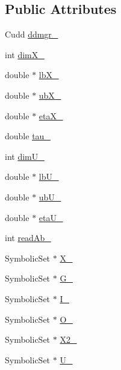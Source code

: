 \subsection*{Public Attributes}
\begin{DoxyCompactItemize}
\item 
Cudd \hyperlink{classscots_1_1Compare_a330d650aa232026ba22f43aa81974af9}{ddmgr\+\_\+}
\item 
int \hyperlink{classscots_1_1Compare_a5ca0b67f243d75684e573bdf39750298}{dim\+X\+\_\+}
\item 
double $\ast$ \hyperlink{classscots_1_1Compare_a73eb8628cb603f8e3fd914e01368c457}{lb\+X\+\_\+}
\item 
double $\ast$ \hyperlink{classscots_1_1Compare_a1ce31ce906f325470edb135b65a3a01a}{ub\+X\+\_\+}
\item 
double $\ast$ \hyperlink{classscots_1_1Compare_ae5fae0a0ea064b629885b69cc32014d1}{eta\+X\+\_\+}
\item 
double \hyperlink{classscots_1_1Compare_a1746834841252ede3651c0f5bfc3e27f}{tau\+\_\+}
\item 
int \hyperlink{classscots_1_1Compare_a4bcfca4afdbb0cc4d0d656702e9f2498}{dim\+U\+\_\+}
\item 
double $\ast$ \hyperlink{classscots_1_1Compare_a2e5b605b24f26910ea99264de9474a33}{lb\+U\+\_\+}
\item 
double $\ast$ \hyperlink{classscots_1_1Compare_a0b0e2f9dd8e872f49eb2a190d9e09dff}{ub\+U\+\_\+}
\item 
double $\ast$ \hyperlink{classscots_1_1Compare_a5bc5261e5403a3e984020cd8b05b587a}{eta\+U\+\_\+}
\item 
int \hyperlink{classscots_1_1Compare_ad18456a4cc253ae0d300cda74517e64b}{read\+Ab\+\_\+}
\item 
Symbolic\+Set $\ast$ \hyperlink{classscots_1_1Compare_a4d0bb95aefd7ffeda946bd79a8170825}{X\+\_\+}
\item 
Symbolic\+Set $\ast$ \hyperlink{classscots_1_1Compare_a1a7d912c19ff01269353ec705a257ad6}{G\+\_\+}
\item 
Symbolic\+Set $\ast$ \hyperlink{classscots_1_1Compare_a32b383c4e137a371859fdee22c165486}{I\+\_\+}
\item 
Symbolic\+Set $\ast$ \hyperlink{classscots_1_1Compare_a5dd50527db402893630c209d05be4ef0}{O\+\_\+}
\item 
Symbolic\+Set $\ast$ \hyperlink{classscots_1_1Compare_a3f1ba24992e2dfe24358087aeecb5a75}{X2\+\_\+}
\item 
Symbolic\+Set $\ast$ \hyperlink{classscots_1_1Compare_ac341e6c2534e4bb4ab248cc767c33b8d}{U\+\_\+}

\end{DoxyCompactItemize}
